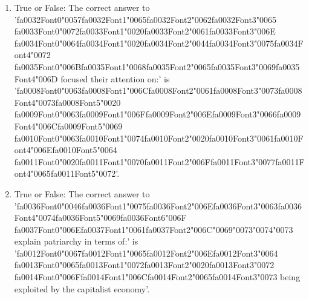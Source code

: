 \documentclass[12pt]{article}
\begin{document}
\begin{enumerate}[label=\arabic*.]
\item True or False: The correct answer to '{\csname fa0032Font0\endcsname\char"0057}{\csname fa0032Font1\endcsname\char"0065}{\csname fa0032Font2\endcsname\char"0062}{\csname fa0032Font3\endcsname\char"0065} {\csname fa0033Font0\endcsname\char"0072}{\csname fa0033Font1\endcsname\char"0020}{\csname fa0033Font2\endcsname\char"0061}{\csname fa0033Font3\endcsname\char"006E} {\csname fa0034Font0\endcsname\char"0064}{\csname fa0034Font1\endcsname\char"0020}{\csname fa0034Font2\endcsname\char"0044}{\csname fa0034Font3\endcsname\char"0075}{\csname fa0034Font4\endcsname\char"0072} {\csname fa0035Font0\endcsname\char"006B}{\csname fa0035Font1\endcsname\char"0068}{\csname fa0035Font2\endcsname\char"0065}{\csname fa0035Font3\endcsname\char"0069}{\csname fa0035Font4\endcsname\char"006D} focused their attention on:' is '{\csname fa0008Font0\endcsname\char"0063}{\csname fa0008Font1\endcsname\char"006C}{\csname fa0008Font2\endcsname\char"0061}{\csname fa0008Font3\endcsname\char"0073}{\csname fa0008Font4\endcsname\char"0073}{\csname fa0008Font5\endcsname\char"0020} {\csname fa0009Font0\endcsname\char"0063}{\csname fa0009Font1\endcsname\char"006F}{\csname fa0009Font2\endcsname\char"006E}{\csname fa0009Font3\endcsname\char"0066}{\csname fa0009Font4\endcsname\char"006C}{\csname fa0009Font5\endcsname\char"0069} {\csname fa0010Font0\endcsname\char"0063}{\csname fa0010Font1\endcsname\char"0074}{\csname fa0010Font2\endcsname\char"0020}{\csname fa0010Font3\endcsname\char"0061}{\csname fa0010Font4\endcsname\char"006E}{\csname fa0010Font5\endcsname\char"0064} {\csname fa0011Font0\endcsname\char"0020}{\csname fa0011Font1\endcsname\char"0070}{\csname fa0011Font2\endcsname\char"006F}{\csname fa0011Font3\endcsname\char"0077}{\csname fa0011Font4\endcsname\char"0065}{\csname fa0011Font5\endcsname\char"0072}'.
\item True or False: The correct answer to '{\csname fa0036Font0\endcsname\char"0046}{\csname fa0036Font1\endcsname\char"0075}{\csname fa0036Font2\endcsname\char"006E}{\csname fa0036Font3\endcsname\char"0063}{\csname fa0036Font4\endcsname\char"0074}{\csname fa0036Font5\endcsname\char"0069}{\csname fa0036Font6\endcsname\char"006F} {\csname fa0037Font0\endcsname\char"006E}{\csname fa0037Font1\endcsname\char"0061}{\csname fa0037Font2\endcsname\char"006C}{\char"0069}{\char"0073}{\char"0074}{\char"0073} explain patriarchy in terms of:' is '{\csname fa0012Font0\endcsname\char"0067}{\csname fa0012Font1\endcsname\char"0065}{\csname fa0012Font2\endcsname\char"006E}{\csname fa0012Font3\endcsname\char"0064} {\csname fa0013Font0\endcsname\char"0065}{\csname fa0013Font1\endcsname\char"0072}{\csname fa0013Font2\endcsname\char"0020}{\csname fa0013Font3\endcsname\char"0072} {\csname fa0014Font0\endcsname\char"006F}{\csname fa0014Font1\endcsname\char"006C}{\csname fa0014Font2\endcsname\char"0065}{\csname fa0014Font3\endcsname\char"0073} being exploited by the capitalist economy'.

\end{enumerate}
\end{document}
